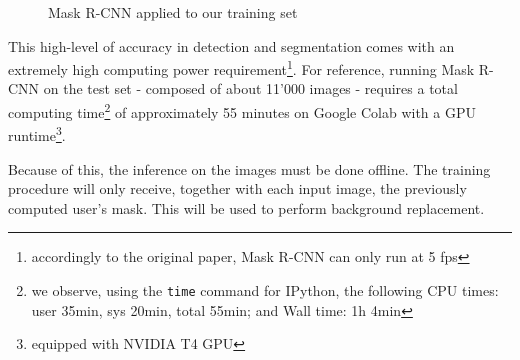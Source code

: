\begin{figure}[!h]
\begin{center}
\begin{subfigure}[h]{0.32\textwidth}
		\end{subfigure}
	\end{center}
	\vspace{-0.5cm}
	\caption[Mask R-CNN applied to our training set]{Mask R-CNN applied to our training set}
	\label{fig:maskrcnn-dario}
\end{figure}

This high-level of accuracy in detection and segmentation comes with an extremely high computing power requirement\footnote{accordingly to the original paper, Mask R-CNN can only run at 5 \gls{fps}}. For reference, running Mask R-CNN on the test set - composed of about 11'000 images - requires a total computing time\footnote{we observe, using the \texttt{time} command for IPython, the following CPU times: user 35min, sys 20min, total 55min; and Wall time: 1h 4min} of approximately 55 minutes on Google Colab with a GPU runtime\footnote{equipped with NVIDIA T4 GPU}.

Because of this, the inference on the images must be done offline. The training procedure will only receive, together with each input image, the previously computed user's mask. This will be used to perform background replacement.









